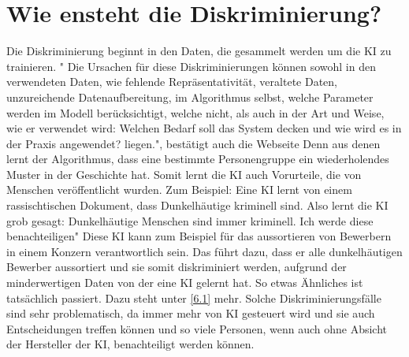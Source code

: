 \documentclass{article}
\begin{document}
\section{Wie ensteht die Diskriminierung?}
Die Diskriminierung beginnt in den Daten, die gesammelt werden um die KI zu trainieren. " Die Ursachen für diese Diskriminierungen können sowohl in den verwendeten Daten, wie fehlende Repräsentativität, veraltete Daten, unzureichende Datenaufbereitung, im Algorithmus selbst, welche Parameter werden im Modell berücksichtigt, welche nicht, als auch in der Art und Weise, wie er verwendet wird: Welchen Bedarf soll das System decken und wie wird es in der Praxis angewendet? liegen.", bestätigt auch die Webseite \citep{DiskriminierendeAlgorithmen}  Denn aus denen lernt der Algorithmus, dass eine bestimmte Personengruppe ein wiederholendes Muster in der Geschichte hat. Somit lernt die KI auch Vorurteile, die von Menschen veröffentlicht wurden. Zum Beispiel: Eine KI lernt von einem rassischtischen Dokument, dass Dunkelhäutige kriminell sind. Also lernt die KI grob gesagt: Dunkelhäutige Menschen sind immer kriminell. Ich werde diese benachteiligen" Diese KI kann zum Beispiel für das aussortieren von Bewerbern in einem Konzern verantwortlich sein. Das führt dazu, dass er alle dunkelhäutigen Bewerber aussortiert und sie somit diskriminiert werden, aufgrund der minderwertigen Daten von der eine KI gelernt hat. So etwas Ähnliches ist tatsächlich passiert. Dazu steht unter \ref{6.1} mehr. Solche Diskriminierungsfälle sind sehr problematisch, da immer mehr von KI gesteuert wird und sie auch Entscheidungen treffen können und so viele Personen, wenn auch ohne Absicht der Hersteller der KI, benachteiligt werden können. 
\end{document}
